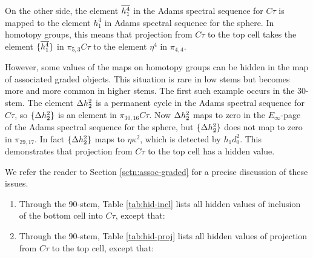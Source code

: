 On the other side, the element $\overline{h_1^4}$ in the 
Adams spectral sequence for $C\tau$ is mapped to the
element $h_1^4$ in Adams spectral sequence for the sphere.
In homotopy groups, this means that projection from $C\tau$ to
the top cell takes the element $\{ \overline{h_1^4} \}$ in $\pi_{5,3}C\tau$
to the element $\eta^4$ in $\pi_{4,4}$.

However, some values of the maps on homotopy groups can be hidden
in the map of associated graded objects.  This situation is rare in
low stems but becomes more and more common in higher stems.
The first such example occurs in the 30-stem.
The element $\Delta h_2^2 $ is a permanent cycle in the Adams spectral
sequence for $C\tau$, so $\{\Delta h_2^2 \}$ is an element in $\pi_{30,16} C\tau$.
Now $\Delta h_2^2$ maps to zero in the $E_\infty$-page of the Adams spectral
sequence for the sphere, but $\{\Delta h_2^2 \}$ does not map to zero
in $\pi_{29,17}$.  In fact $\{\Delta h_2^2 \}$ maps to $\eta \kappa^2$,
which is detected by $h_1 d_0^2$.
This demonstrates that projection from $C\tau$ to the top cell
has a hidden value.

We refer the reader to Section \ref{sctn:assoc-graded}
for a precise discussion of these issues.

\begin{thm}
\label{thm:hid-incl-proj}
\mbox{}
\begin{enumerate}
\item
Through the 90-stem,
Table \ref{tab:hid-incl} lists all
hidden values of inclusion of the bottom cell into $C\tau$,
except that:
\item
Through the 90-stem, Table \ref{tab:hid-proj} lists all
hidden values of projection from $C\tau$ to the top cell,
except that:
\end{enumerate}
\end{thm}

